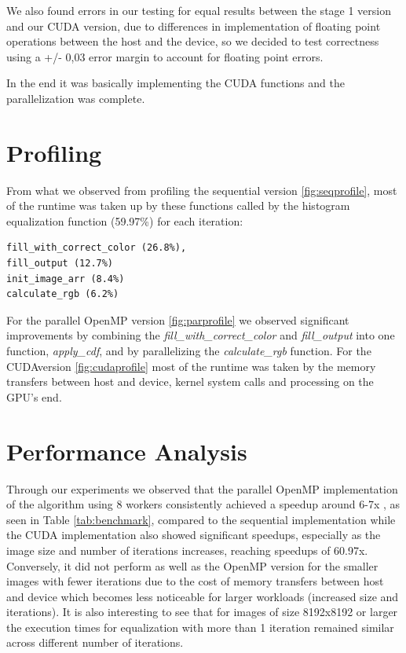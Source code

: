 \documentclass[sigconf]{acmart}
\begin{document}
    We also found errors in our testing for equal results between the stage 1 version and our CUDA version, due to differences in implementation of floating point operations between the host and the device, so we decided to test correctness using a +/- 0,03 error margin to account for floating point errors.

    In the end it was basically implementing the CUDA functions and the parallelization was complete.

    \section{Profiling}
    From what we observed from profiling the sequential version \ref{fig:seqprofile}, most of the runtime was taken up by these functions called by the histogram equalization function (59.97\%) for each iteration: \begin{lstlisting}
fill_with_correct_color (26.8%),
fill_output (12.7%)
init_image_arr (8.4%)
calculate_rgb (6.2%)
    \end{lstlisting}
    For the parallel OpenMP version \ref{fig:parprofile} we observed significant improvements by combining the \textit{fill{\_}with{\_}correct{\_}color} and \textit{fill{\_}output} into one function, \textit{apply{\_}cdf}, and by parallelizing the \textit{calculate{\_}rgb} function.
    For the CUDAversion \ref{fig:cudaprofile} most of the runtime was taken by the memory transfers between host and device, kernel system calls and processing on the GPU's end.


    \section{Performance Analysis}
    Through our experiments we observed that the parallel OpenMP implementation of the algorithm using 8 workers consistently achieved a speedup around 6-7x , as seen in Table \ref{tab:benchmark}, compared to the sequential implementation while the CUDA implementation also showed significant speedups, especially as the image size and number of iterations increases, reaching speedups of 60.97x. Conversely, it did not perform as well as the OpenMP version for the smaller images with fewer iterations due to the cost of memory transfers between host and device which becomes less noticeable for larger workloads (increased size and iterations).
    It is also interesting to see that for images of size 8192x8192 or larger the execution times for equalization with more than 1 iteration remained similar across different number of iterations.
\end{document}
